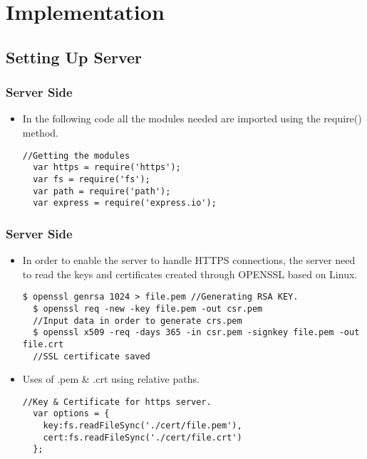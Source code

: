 \section{Implementation}
\subsection{Setting Up Server}

\begin{frame}[fragile]\frametitle{Server Side}
\begin{itemize}
 \item In the following code all the modules needed are imported using the require() method.
  \begin{lstlisting}[style=JavaScript]
  //Getting the modules
  var https = require('https');
  var fs = require('fs');
  var path = require('path');
  var express = require('express.io');
  \end{lstlisting}
\end{itemize}
\end{frame}

\begin{frame}[fragile]\frametitle{Server Side}
\begin{itemize}

 \item In order to enable the server to handle HTTPS connections, the server need to read the keys and certificates
created through OPENSSL based on Linux.
  \begin{lstlisting}[style=JavaScript]
  $ openssl genrsa 1024 > file.pem //Generating RSA KEY.
  $ openssl req -new -key file.pem -out csr.pem 
  //Input data in order to generate crs.pem
  $ openssl x509 -req -days 365 -in csr.pem -signkey file.pem -out file.crt 
  //SSL certificate saved
  \end{lstlisting}


\item Uses of .pem \& .crt using relative paths.

  \begin{lstlisting}[style=JavaScript]
  //Key & Certificate for https server.
  var options = {
	key:fs.readFileSync('./cert/file.pem'),
	cert:fs.readFileSync('./cert/file.crt')
  };
  \end{lstlisting}
\end{itemize}
\end{frame}

